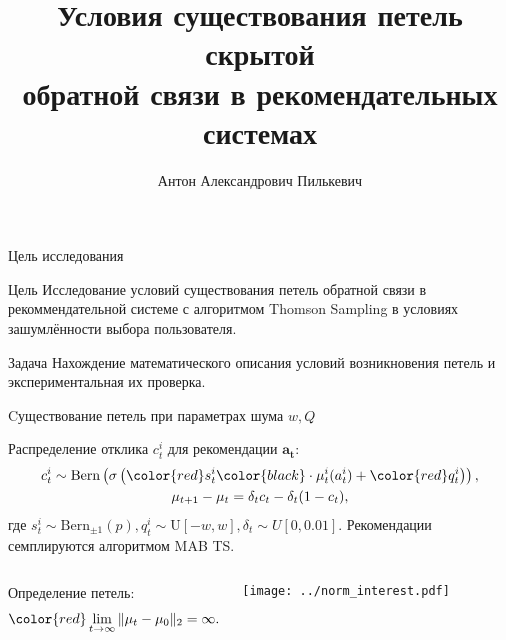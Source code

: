 \documentclass{beamer}
\title[\hbox to 56mm{Петли скрытой обратной связи}]{ Условия существования петель скрытой \\ обратной связи в рекомендательных системах }
\author[А.\,А. Пилькевич]{Антон Александрович Пилькевич}
\institute{Московский физико-технический институт}
\date{\footnotesize
\par\smallskip\emph{Курс:} Автоматизация научных исследований\par (практика, В.\,В.~Стрижов)/Группа 813
\par\smallskip\emph{Эксперт:} А.\,С.~Хританков
\par\smallskip\emph{Консультант:} А.\,С.~Хританков
\par\bigskip\small 2021}
\begin{document}
\begin{frame}
\thispagestyle{empty}
\maketitle
\end{frame}
\begin{frame}{Цель исследования}
\begin{block}{Цель}
  Исследование условий существования петель обратной
связи в рекоммендательной системе с алгоритмом Thomson Sampling в условиях зашумлённости выбора пользователя.
\end{block}
\begin{block}{Задача}
  Нахождение математического описания условий возникновения петель и экспериментальная их проверка. 
\end{block}
\end{frame}
\begin{frame}{Cуществование петель при параметрах шума $w, Q$}

Распределение отклика $c_t^i$ для рекомендации $\mathbf{a_t}$:
\begin{gather*}
    c_t^i \sim \text{Bern} \left(\sigma\left( \color{red} s_t^i \color{black} \cdot \mu_t^i (a_t^i) + \mathbin{\color{red} q_t^i } \right) \right), \\ 
    \mu_{t+1} - \mu_{t} = \delta_t c_t - \delta_t (1 - c_t), 
\end{gather*}
где $s_t^i \sim \text{Bern}_{\pm 1}(p), q_t^i \sim \text{U}[-w, w], \delta_t \sim U[0, 0.01].$
Рекомендации семплируются алгоритмом MAB TS.

\begin{columns}[c]
Определение петель: 
\begin{gather*}
  \color{red} \lim_{t \to \infty} \|\mu_t - \mu_0 \|_2 = \infty.
\end{gather*}
\begin{center}
  \texttt{[image: ../norm\_interest.pdf]}
\end{center}
\end{columns}
\end{frame}
\end{document}
